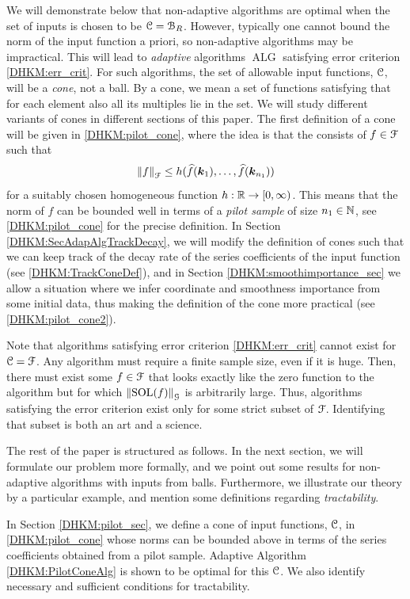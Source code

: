 \documentclass[USenglish]{article}
\theoremstyle{dgthm}
\theoremstyle{dgthm}
\theoremstyle{dgthm}
\theoremstyle{dgthm}
\theoremstyle{dgdef}
\theoremstyle{definition}
\DeclareMathOperator{\SOL}{SOL}
\DeclareMathOperator{\ALG}{ALG}
\newcommand{\hf}{\widehat{f}}
\newcommand{\norm}[2][{}]{\ensuremath{\left \lVert #2 \right \rVert}_{#1}}
\begin{document}
{We will demonstrate below that non-adaptive algorithms are optimal when the set of inputs is chosen to be ${\mathcal{C}} = {\mathcal{B}}_R$. However, typically one cannot bound the norm of the input function a priori, so non-adaptive algorithms may be impractical. 
  This will lead to \emph{adaptive} algorithms $\ALG$ satisfying error criterion \eqref{DHKM:err_crit}.  For such algorithms, the set of allowable input functions, ${\mathcal{C}}$, will be a \emph{cone}, not a ball. By a cone, we mean a set of functions satisfying that for each element also all its multiples lie in the set. We will study different variants of cones in different sections of this paper. The first definition of a cone will be given in \eqref{DHKM:pilot_cone}, 
where the idea is that the consists of $f\in{\mathcal{F}}$ such that 
$$
  \norm[\calF]{f}\le h (\hf(\bsk_1),\ldots,\hf (\bsk_{n_1}))
$$
for a suitably chosen homogeneous function $h:{\mathbb{R}}\rightarrow [0,\infty)$. This means that the norm of $f$ can be bounded well in terms of 
a \emph{pilot sample} of size $n_1\in{\mathbb{N}}$, see \eqref{DHKM:pilot_cone} for the precise definition. In Section \ref{DHKM:SecAdapAlgTrackDecay}, we will modify the definition of cones such that we can keep track of the decay rate of the series coefficients of the input function (see \eqref{DHKM:TrackConeDef}), 
and in Section \ref{DHKM:smoothimportance_sec} we allow a situation 
where we infer coordinate and smoothness importance from some initial data, thus making the definition of the cone more practical (see  
\eqref{DHKM:pilot_cone2}).

Note that algorithms satisfying error criterion \eqref{DHKM:err_crit} cannot exist for ${\mathcal{C}} = {\mathcal{F}}$. Any algorithm must require a finite sample size, even if it is huge.  Then, there must exist some $f \in {\mathcal{F}}$ that looks exactly like the zero function to the algorithm but for which $\norm[\calG]{\SOL(f)}$ is arbitrarily large.  Thus, algorithms satisfying the error criterion  exist only for some strict subset of ${\mathcal{F}}$.  Identifying that subset is both an art and a science.


The rest of the paper is structured as follows. In the next section, we will formulate our problem more formally, and we point out some results for non-adaptive algorithms with inputs from balls. Furthermore, we illustrate our theory by 
a particular example, and mention some definitions regarding \emph{tractability}. 


In Section \ref{DHKM:pilot_sec}, we define a cone of input functions, ${\mathcal{C}}$, in \eqref{DHKM:pilot_cone} whose norms can be bounded above in terms of the series coefficients obtained from a pilot sample.  Adaptive Algorithm \ref{DHKM:PilotConeAlg} is shown to be optimal for this ${\mathcal{C}}$.  We also identify necessary and sufficient conditions for tractability.

}
\end{document}
